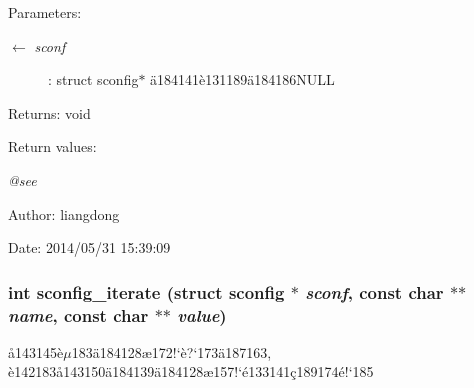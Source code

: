 \begin{Desc}
\item[Parameters:]
\begin{description}
\item[\mbox{$\leftarrow$} {\em sconf}]: struct sconfig$\ast$ \"{a}184141\`{e}131189\"{a}184186NULL \end{description}
\end{Desc}
\begin{Desc}
\item[Returns:]void \end{Desc}
\begin{Desc}
\item[Return values:]
\begin{description}
\item[{\em @see}]\end{description}
\end{Desc}
\begin{Desc}
\item[Author:]liangdong \end{Desc}
\begin{Desc}
\item[Date:]2014/05/31 15:39:09 \end{Desc}
\subsubsection{\setlength{\rightskip}{0pt plus 5cm}int sconfig\_\-iterate (struct sconfig $\ast$ {\em sconf}, const char $\ast$$\ast$ {\em name}, const char $\ast$$\ast$ {\em value})}\label{sconfig_8h_a10}


\aa{}143145\`{e}$\mu$183\"{a}184128\ae{}172!`\`{e}?`173\"{a}187163, \`{e}142183\aa{}143150\"{a}184139\"{a}184128\ae{}157!`\'{e}133141\c{c}189174\'{e}!`185 

